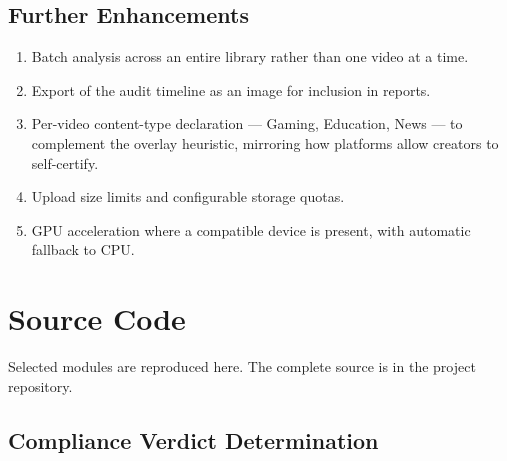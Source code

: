 \documentclass[
12pt,
a4paper,
oneside
]{report}
\begin{document}
\section{Further Enhancements}

\begin{enumerate}[itemsep=3pt]
\item Batch analysis across an entire library rather than one video at a time.
\item Export of the audit timeline as an image for inclusion in reports.
\item Per-video content-type declaration --- Gaming, Education, News --- to
complement the overlay heuristic, mirroring how platforms allow creators to
self-certify.
\item Upload size limits and configurable storage quotas.
\item GPU acceleration where a compatible device is present, with automatic
fallback to CPU.
\end{enumerate}


\appendix

\chapter{Source Code}

Selected modules are reproduced here. The complete source is in the project
repository.

\section{Compliance Verdict Determination}
\end{document}
